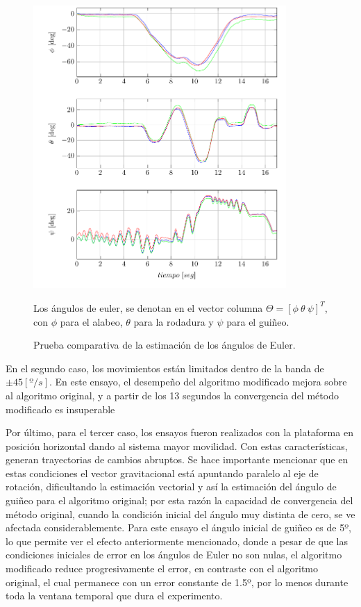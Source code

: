 \documentclass[conference]{IEEEtran}
\begin{document}
\begin{figure}
\begin{center}
\includegraphics[width=26em]{PlotAngles1.pdf}
\caption{Prueba comparativa de la estimación de los ángulos de Euler. }
\label{PlotPh1}
\scriptsize{Los ángulos de euler, se denotan en el vector columna $\Theta=[\phi~\theta~\psi]^T$, con $\phi$ para el alabeo, $\theta$ para la rodadura y $\psi$ para el guiñeo.}
\end{center}
\end{figure}
En el segundo caso, los movimientos están limitados dentro de la banda de $\pm45[º/s]$. En este ensayo, el desempeño del algoritmo modificado mejora sobre al algoritmo original, y a partir de los 13 segundos la convergencia del método modificado es insuperable\par
Por último, para el tercer caso, los ensayos fueron realizados con la plataforma en posición horizontal dando al sistema mayor movilidad. Con estas características, generan trayectorias de cambios abruptos. Se hace importante mencionar que en estas condiciones el vector gravitacional está apuntando paralelo al eje de rotación, dificultando la estimación vectorial y así la estimación del ángulo de guiñeo para el algoritmo original; por esta razón la capacidad de convergencia del método original, cuando la condición inicial del ángulo muy distinta de cero, se ve afectada considerablemente. Para este ensayo el ángulo inicial de guiñeo es de 5º, lo que permite ver el efecto anteriormente mencionado, donde a pesar de que las condiciones iniciales de error en los ángulos de Euler no son nulas, el algoritmo modificado reduce progresivamente el error, en contraste con el algoritmo original, el cual permanece con un error constante de 1.5º, por lo menos durante toda la ventana temporal que dura el experimento.\par
\end{document}
